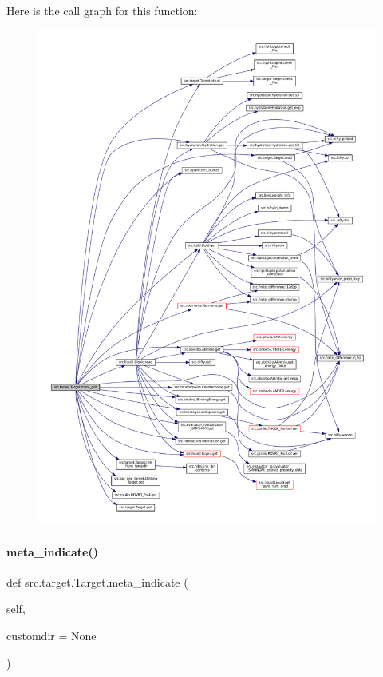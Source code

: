 Here is the call graph for this function\+:
\nopagebreak
\begin{figure}[H]
\begin{center}
\leavevmode
\includegraphics[width=350pt]{classsrc_1_1target_1_1Target_a14ccb9a63ebc92a83ead58965f13fcc7_cgraph}
\end{center}
\end{figure}
\mbox{\label{classsrc_1_1target_1_1Target_a75dc5c4428df625f265e481f61718ec1}} 
\paragraph{\texorpdfstring{meta\+\_\+indicate()}{meta\_indicate()}}
{\footnotesize\ttfamily def src.\+target.\+Target.\+meta\+\_\+indicate (\begin{DoxyParamCaption}\item[{}]{self,  }\item[{}]{customdir = {\ttfamily None} }\end{DoxyParamCaption})\hspace{0.3cm}{\ttfamily [inherited]}}



